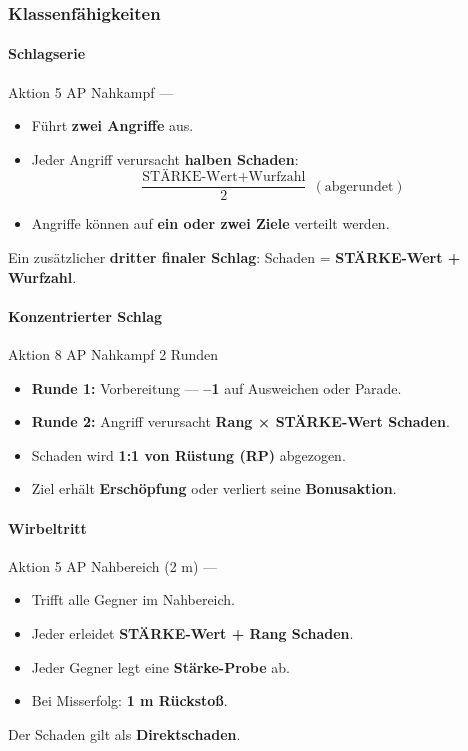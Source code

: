 \subsubsection*{Klassenfähigkeiten}

\paragraph*{Schlagserie}

\skillcard
{}
{Aktion}
{5 AP}
{Nahkampf}
{—}
{
	\begin{itemize}
		\item Führt \textbf{zwei Angriffe} aus.
		\item Jeder Angriff verursacht \textbf{halben Schaden}:
		\[
		\frac{\text{STÄRKE-Wert} + \text{Wurfzahl}}{2} \ (\text{abgerundet})
		\]
		\item Angriffe können auf \textbf{ein oder zwei Ziele} verteilt werden.
	\end{itemize}
}
{
	Ein zusätzlicher \textbf{dritter finaler Schlag}:
	Schaden = \textbf{STÄRKE-Wert + Wurfzahl}.
}

\paragraph*{Konzentrierter Schlag}

\skillcard
{}
{Aktion}
{8 AP}
{Nahkampf}
{2 Runden}
{
	\begin{itemize}
		\item \textbf{Runde 1:} Vorbereitung —
		\textbf{--1} auf Ausweichen oder Parade.
		\item \textbf{Runde 2:} Angriff verursacht
		\textbf{Rang × STÄRKE-Wert Schaden}.
	\end{itemize}
}
{
	\begin{itemize}
		\item Schaden wird \textbf{1:1 von Rüstung (RP)} abgezogen.
		\item Ziel erhält \textbf{Erschöpfung} oder verliert seine \textbf{Bonusaktion}.
	\end{itemize}
}

\paragraph*{Wirbeltritt}

\skillcard
{}
{Aktion}
{5 AP}
{Nahbereich (2 m)}
{—}
{
	\begin{itemize}
		\item Trifft alle Gegner im Nahbereich.
		\item Jeder erleidet \textbf{STÄRKE-Wert + Rang Schaden}.
		\item Jeder Gegner legt eine \textbf{Stärke-Probe} ab.
		\item Bei Misserfolg: \textbf{1 m Rückstoß}.
	\end{itemize}
}
{
	Der Schaden gilt als \textbf{Direktschaden}.
}

